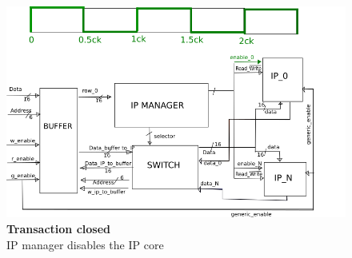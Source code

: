      \begin{figure}[h]
     	\centering
     	\includegraphics[scale=0.75]{chapters/figures/read_4.png}  
     	\caption{\textbf{Transaction closed}\\ IP manager disables the IP core}
     	\label{fig:4}
     \end{figure}
